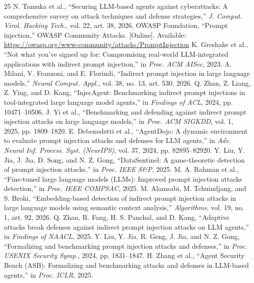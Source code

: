 \documentclass[conference]{IEEEtran}
\begin{document}
\begin{thebibliography}{25}
 N. Tamuka et al., ``Securing LLM-based agents against cyberattacks: A comprehensive survey on attack techniques and defense strategies,'' \textit{J. Comput. Virol. Hacking Tech.}, vol. 22, art. 38, 2026.
 OWASP Foundation, ``Prompt injection,'' OWASP Community Attacks. [Online]. Available: \url{https://owasp.org/www-community/attacks/PromptInjection}
 K. Greshake et al., ``Not what you've signed up for: Compromising real-world LLM-integrated applications with indirect prompt injection,'' in \textit{Proc. ACM AISec}, 2023.
 A. Milani, V. Franzoni, and E. Florindi, ``Indirect prompt injection in large language models,'' \textit{Neural Comput. Appl.}, vol. 38, no. 13, art. 530, 2026.
 Q. Zhan, Z. Liang, Z. Ying, and D. Kang, ``InjecAgent: Benchmarking indirect prompt injections in tool-integrated large language model agents,'' in \textit{Findings of ACL}, 2024, pp. 10471--10506.
 J. Yi et al., ``Benchmarking and defending against indirect prompt injection attacks on large language models,'' in \textit{Proc. ACM SIGKDD}, vol. 1, 2025, pp. 1809--1820.
 E. Debenedetti et al., ``AgentDojo: A dynamic environment to evaluate prompt injection attacks and defenses for LLM agents,'' in \textit{Adv. Neural Inf. Process. Syst. (NeurIPS)}, vol. 37, 2024, pp. 82895--82920.
 Y. Liu, Y. Jia, J. Jia, D. Song, and N. Z. Gong, ``DataSentinel: A game-theoretic detection of prompt injection attacks,'' in \textit{Proc. IEEE S\&P}, 2025.
 M. A. Rahman et al., ``Fine-tuned large language models (LLMs): Improved prompt injection attacks detection,'' in \textit{Proc. IEEE COMPSAC}, 2025.
 M. Alamsabi, M. Tchuindjang, and S. Brohi, ``Embedding-based detection of indirect prompt injection attacks in large language models using semantic context analysis,'' \textit{Algorithms}, vol. 19, no. 1, art. 92, 2026.
 Q. Zhan, R. Fang, H. S. Panchal, and D. Kang, ``Adaptive attacks break defenses against indirect prompt injection attacks on LLM agents,'' in \textit{Findings of NAACL}, 2025.
 Y. Liu, Y. Jia, R. Geng, J. Jia, and N. Z. Gong, ``Formalizing and benchmarking prompt injection attacks and defenses,'' in \textit{Proc. USENIX Security Symp.}, 2024, pp. 1831--1847.
 H. Zhang et al., ``Agent Security Bench (ASB): Formalizing and benchmarking attacks and defenses in LLM-based agents,'' in \textit{Proc. ICLR}, 2025.

\end{thebibliography}
\end{document}
